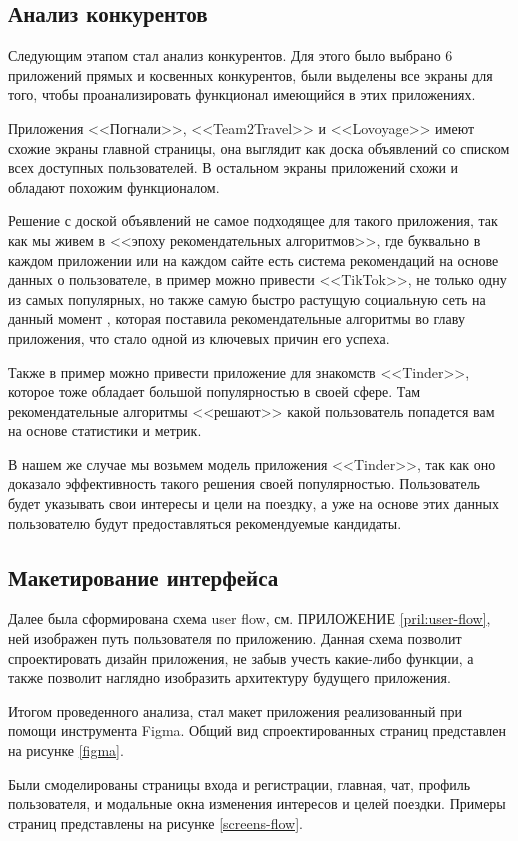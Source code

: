\subsection{Анализ конкурентов}

Следующим этапом стал анализ конкурентов. Для этого было выбрано 6 приложений прямых и косвенных конкурентов, были выделены все экраны для того, чтобы проанализировать функционал имеющийся в этих приложениях.


Приложения <<Погнали>>, <<Team2Travel>> и <<Lovoyage>> имеют схожие экраны  главной страницы, она выглядит как доска объявлений со списком всех доступных пользователей. В остальном экраны приложений схожи и обладают похожим функционалом.

Решение с доской объявлений не самое подходящее для такого приложения, так как мы живем в <<эпоху рекомендательных алгоритмов>>, где буквально в каждом приложении или на каждом сайте есть система рекомендаций на основе данных о пользователе, в пример можно привести <<TikTok>>, не только одну из самых популярных, но также самую быстро растущую социальную сеть на данный момент \cite{tiktok-growth}, которая поставила рекомендательные алгоритмы во главу приложения, что стало одной из ключевых причин его успеха.

Также в пример можно привести приложение для знакомств <<Tinder>>, которое тоже обладает большой популярностью в своей сфере. Там рекомендательные алгоритмы <<решают>> какой пользователь попадется вам на основе статистики и метрик.

В нашем же случае мы возьмем модель приложения <<Tinder>>, так как оно доказало эффективность такого решения своей популярностью. Пользователь будет указывать свои интересы и цели на поездку, а уже на основе этих данных пользователю будут предоставляться рекомендуемые кандидаты.

\subsection{Макетирование интерфейса}

Далее была сформирована схема user flow, см. ПРИЛОЖЕНИЕ \ref{pril:user-flow}, ней изображен путь пользователя по приложению. Данная схема позволит спроектировать дизайн приложения, не забыв учесть какие-либо функции, а также позволит наглядно изобразить архитектуру будущего приложения.

Итогом проведенного анализа, стал макет приложения реализованный при помощи инструмента Figma. Общий вид спроектированных страниц представлен на рисунке \ref{figma}.


Были смоделированы страницы входа и регистрации, главная, чат, профиль пользователя, и модальные окна изменения интересов и целей поездки. Примеры страниц представлены на рисунке \ref{screens-flow}.

